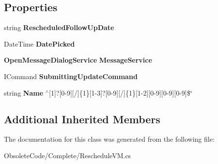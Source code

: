 \subsection*{Properties}
\begin{DoxyCompactItemize}
\item 
\mbox{\label{class_a_f_h___scheduler_1_1_complete_1_1_reschedule_v_m_aa7d0c3ef4f894fc625c7477b854980be}} 
string {\bfseries Rescheduled\+Follow\+Up\+Date}\hspace{0.3cm}{\ttfamily  [get, set]}
\item 
\mbox{\label{class_a_f_h___scheduler_1_1_complete_1_1_reschedule_v_m_ade5f6d063f2d61b3d2b8c554c7dcf6cd}} 
Date\+Time {\bfseries Date\+Picked}\hspace{0.3cm}{\ttfamily  [get, set]}
\item 
\mbox{\label{class_a_f_h___scheduler_1_1_complete_1_1_reschedule_v_m_a6999e9814861f76219537a8e38e8fe6d}} 
\textbf{ Open\+Message\+Dialog\+Service} {\bfseries Message\+Service}\hspace{0.3cm}{\ttfamily  [get, set]}
\item 
\mbox{\label{class_a_f_h___scheduler_1_1_complete_1_1_reschedule_v_m_a3220f18e5736719487b690928c0bfa24}} 
I\+Command {\bfseries Submitting\+Update\+Command}\hspace{0.3cm}{\ttfamily  [get]}
\item 
\mbox{\label{class_a_f_h___scheduler_1_1_complete_1_1_reschedule_v_m_ac89251c5bbb5a46f29697543848b1828}} 
string {\bfseries Name} $^\wedge$[1]?[0-\/9][/]\{1\}[1-\/3]?[0-\/9][/]\{1\}[1-\/2][0-\/9][0-\/9][0-\/9]\$\char`\"{}\hspace{0.3cm}{\ttfamily  [get]}
\end{DoxyCompactItemize}
\subsection*{Additional Inherited Members}


The documentation for this class was generated from the following file\+:\begin{DoxyCompactItemize}
\item 
Obsolete\+Code/\+Complete/Reschedule\+V\+M.\+cs\end{DoxyCompactItemize}
